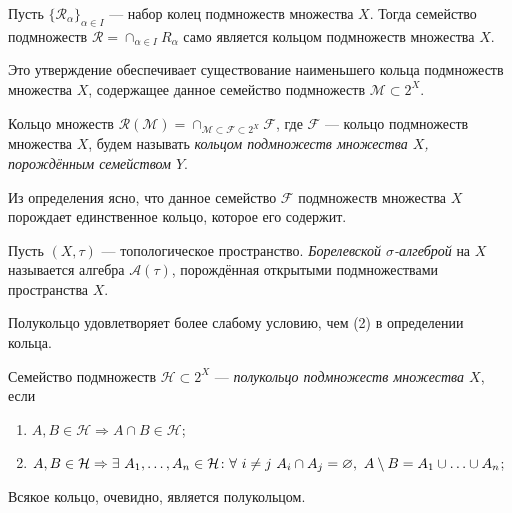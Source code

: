 \begin{prop}
	Пусть $\{\mathcal{R}_{\alpha}\}_{\alpha\in I}$ --- набор колец подмножеств множества $X$. Тогда семейство подмножеств $\mathcal{R}=\displaystyle\cap_{\alpha\in I} R_{\alpha}$ само является кольцом подмножеств множества $X$.
\end{prop}
Это утверждение обеспечивает существование наименьшего кольца подмножеств множества $X$, содержащее данное семейство подмножеств $\mathcal{M}\subset 2^X$.
\begin{defin}
	Кольцо множеств $\mathcal{R}(\mathcal{M})=\displaystyle\cap_{\mathcal{M}\subset\mathcal{F}\subset 2^X} \mathcal{F}$, где $\mathcal{F}$ --- кольцо подмножеств множества $X$, будем называть \textit{кольцом подмножеств множества $X$, порождённым семейством $Y$}. 
\end{defin}
Из определения ясно, что данное семейство $\mathcal{F}$ подмножеств множества $X$ порождает единственное кольцо, которое его содержит.
\begin{defin}
	Пусть $(X,\tau)$ --- топологическое пространство. \textit{Борелевской $\sigma$-алгеброй} на $X$ называется алгебра $\mathcal{A}(\tau)$, порождённая открытыми подмножествами пространства $X$.
\end{defin}

Полукольцо удовлетворяет более слабому условию, чем (2) в определении кольца.
\begin{defin}
	Семейство подмножеств $\mathcal{H}\subset 2^X$ --- \textit{полукольцо подмножеств множества $X$}, если
	\begin{enumerate}
		\item $A,B\in\mathcal{H}\Rightarrow A\cap B\in\mathcal{H}$;
		\item $A,B\in\mathcal{H}\Rightarrow\exists\ A_1,\ldots,A_n\in\mathcal{H}\such \forall\ i\neq j\ A_i\cap A_j=\varnothing,\ A\setminus B=A_1\cup\ldots\cup A_n$;
	\end{enumerate}
\end{defin}
Всякое кольцо, очевидно, является полукольцом.

